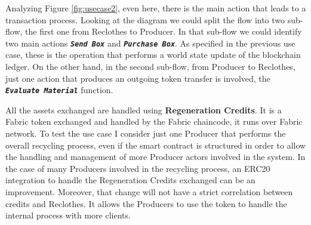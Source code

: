 \bigskip 
Analyzing Figure \ref{fig:usecase2}, even here, there is the main action that leads to a transaction process. 
Looking at the diagram we could split the flow into two sub-flow, the first one from Reclothes to Producer. In 
that sub-flow we could identify two main actions \textbf{\texttt{\textit{Send Box}}} and 
\textbf{\texttt{\textit{Purchase Box}}}.  As specified in the previous use case, these is the operation that 
performs a world state update of the blockchain ledger. On the other hand, in the second sub-flow, from Producer 
to Reclothes, just one action that produces an outgoing token transfer is involved, the 
\textbf{\texttt{\textit{Evaluate Material}}} function. 

\bigskip 
All the assets exchanged are handled using \textbf{Regeneration Credits}. It is a Fabric token exchanged and 
handled by the Fabric chaincode, it runs over Fabric network. To test the use case I consider just one 
Producer that performs the overall recycling process, even if the smart contract is structured in order to 
allow the handling and management of more Producer actors involved in the system. In the case of many Producers 
involved in the recycling process, an ERC20 integration to handle the Regeneration
Credits exchanged can be an improvement. Moreover, that change will not have a strict correlation 
between credits and Reclothes. It allows the Producers to use the token to handle the internal process with 
more clients. 


